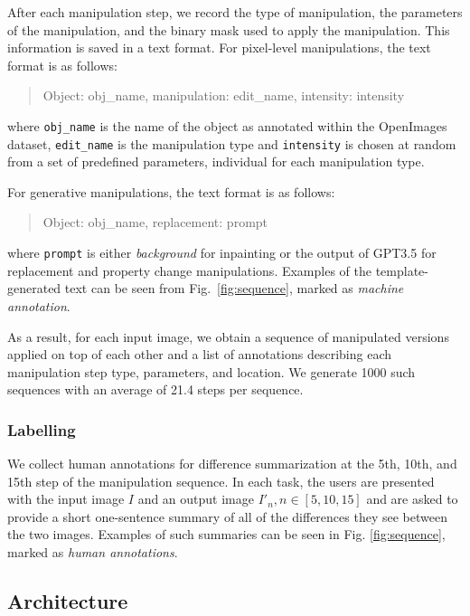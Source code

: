 \documentclass[10pt,twocolumn,letterpaper]{article}
\begin{document}
After each manipulation step, we record the type of manipulation, the parameters
of the manipulation, and the binary mask used to apply the manipulation. This information
is saved in a text format. For pixel-level manipulations, the text format is 
as follows:
\begin{quote}
    \centering
     Object: {obj\_name}, manipulation: {edit\_name}, intensity: {intensity}
\end{quote}
where \texttt{obj\_name} is the name of the object as annotated within the OpenImages dataset,
\texttt{edit\_name} is the manipulation type and \texttt{intensity} is chosen at random from a set of
predefined parameters, individual for each manipulation type. 

For generative manipulations, the text format is as follows:
\begin{quote}
    \centering
     Object: {obj\_name}, replacement: {prompt}
\end{quote}
where \texttt{prompt} is either \textit{background} for inpainting or the output of GPT3.5 for replacement
and property change manipulations. Examples of the template-generated text can be seen from Fig.~\ref{fig:sequence}, marked as \textit{machine annotation}.

As a result, for each input image, we obtain a sequence of manipulated versions
applied on top of each other and a list of annotations describing each
manipulation step type, parameters, and location. We generate 1000 such sequences
with an average of 21.4 steps per sequence.

\subsubsection{Labelling}

We collect human annotations for difference summarization at the 5th, 10th, and 15th
step of the manipulation sequence. In each task, the users are presented with
the input image $I$ and an output image $I'_n, n\in [5,10,15]$ and are asked to
provide a short one-sentence summary of all of the differences they see between the two images.
Examples of such summaries can be seen in Fig. \ref{fig:sequence}, marked as
\textit{human annotations}.

\subsection{Architecture}
\label{sec:arch}
\end{document}
